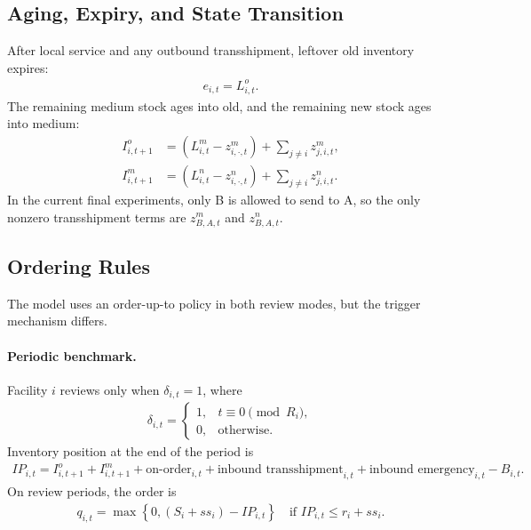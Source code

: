 \documentclass[11pt]{article}
\begin{document}
\subsection{Aging, Expiry, and State Transition}
After local service and any outbound transshipment, leftover old inventory expires:
\begin{align}
e_{i,t} = L^o_{i,t}.
\end{align}
The remaining medium stock ages into old, and the remaining new stock ages into medium:
\begin{align}
I^o_{i,t+1} &= \left(L^m_{i,t} - z^m_{i,\cdot,t}\right) + \sum_{j \ne i} z^m_{j,i,t},\\
I^m_{i,t+1} &= \left(L^n_{i,t} - z^n_{i,\cdot,t}\right) + \sum_{j \ne i} z^n_{j,i,t}.
\end{align}
In the current final experiments, only B is allowed to send to A, so the only nonzero transshipment terms are $z^m_{B,A,t}$ and $z^n_{B,A,t}$.

\subsection{Ordering Rules}
The model uses an order-up-to policy in both review modes, but the trigger mechanism differs.

\paragraph{Periodic benchmark.}
Facility $i$ reviews only when $\delta_{i,t}=1$, where
\begin{align}
\delta_{i,t} =
\begin{cases}
1, & t \equiv 0 \pmod{R_i},\\
0, & \text{otherwise}.
\end{cases}
\end{align}
Inventory position at the end of the period is
\begin{align}
IP_{i,t} = I^o_{i,t+1} + I^m_{i,t+1} + \text{on-order}_{i,t} + \text{inbound transshipment}_{i,t} + \text{inbound emergency}_{i,t} - B_{i,t}.
\end{align}
On review periods, the order is
\begin{align}
q_{i,t} = \max\left\{0,\left(S_i + ss_i\right) - IP_{i,t}\right\}
\quad \text{if } IP_{i,t} \le r_i + ss_i.
\end{align}
\end{document}

